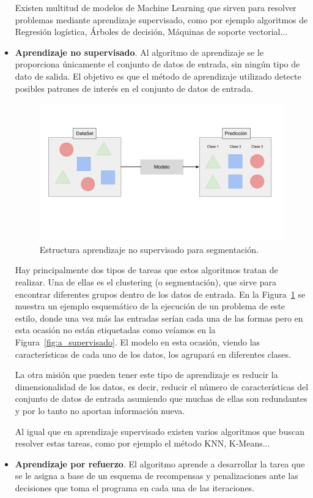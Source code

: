 \documentclass[a4paper, 12pt]{book}
\begin{document}
\begin{itemize}
    Existen multitud de modelos de Machine Learning que sirven para resolver problemas mediante aprendizaje supervisado, como por ejemplo algoritmos de Regresión logística, Árboles de decisión, Máquinas de soporte vectorial...
    
    \item \textbf{Aprendizaje no supervisado}. Al algoritmo de aprendizaje se le proporciona únicamente el conjunto de datos de entrada, sin ningún tipo de dato de salida. El objetivo es que el método de aprendizaje utilizado detecte posibles patrones de interés en el conjunto de datos de entrada. 
    
    \begin{figure}[]
      \centering
      \includegraphics[width=12cm, keepaspectratio]{img/a_no_supervisado.png}
      \caption{Estructura aprendizaje no supervisado para segmentación.}\label{fig:a_no_supervisado}
    \end{figure}
    
    Hay principalmente dos tipos de tareas que estos algoritmos tratan de realizar. Una de ellas es el clustering (o segmentación), que sirve para encontrar diferentes grupos dentro de los datos de entrada. En la Figura~\ref{fig:a_no_supervisado} se muestra un ejemplo esquemático de la ejecución de un problema de este estilo, donde una vez más las entradas serían cada una de las formas pero en esta ocasión no están etiquetadas como veíamos en la Figura~\ref{fig:a_supervisado}. El modelo en esta ocasión, viendo las características de cada uno de los datos, los agrupará en diferentes clases.
    
    La otra misión que pueden tener este tipo de aprendizaje es reducir la dimensionalidad de los datos, es decir, reducir el número de características del conjunto de datos de entrada asumiendo que muchas de ellas son redundantes y por lo tanto no aportan información nueva.
    
    Al igual que en aprendizaje supervisado existen varios algoritmos que buscan resolver estas tareas, como por ejemplo el método KNN, K-Means...
    
    \item \textbf{Aprendizaje por refuerzo}. El algoritmo aprende a desarrollar la tarea que se le asigna a base de un esquema de recompensas y penalizaciones ante las decisiones que toma el programa en cada una de las iteraciones.
\end{itemize}
\end{document}
